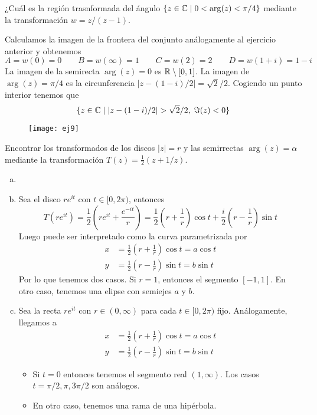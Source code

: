 \documentclass[twoside]{article}
\begin{document}
\begin{ejercicio}{9}
¿Cuál es la región trasnformada del ángulo $\{z\in \mathbb{C}\mid 0<\arg(z)<\pi/4\}$ mediante la transformación $w=z/(z-1)$.
\end{ejercicio}
\begin{solucion}
Calculamos la imagen de la frontera del conjunto análogamente al ejercicio anterior y obtenemos
$$
A = w(0)= 0 \qquad B=w(\infty)=1 \qquad C= w(2)=2 \qquad D =w(1+i) = 1-i 
$$
La imagen de la semirecta $\arg(z)=0$ es $\mathbb{R}\setminus[0,1]$. La imagen de $\arg(z)=\pi/4$ es la circunferencia $|z-(1-i)/2|=\sqrt{2}/2$. Cogiendo un punto interior tenemos que
$$
\{z\in \C \mid |z-(1-i)/2|>\sqrt{2}/2, \;\Im(z)<0\}
$$
\begin{figure}[h]
\texttt{[image: ej9]}
\centering
\end{figure}
\end{solucion}
\newpage

\begin{ejercicio}{10}
Encontrar los transformados de los discos $|z|=r$ y las semirrectas $\arg(z)=\alpha$ mediante la transformación $T(z)=\frac{1}{2}(z+1/z)$.
\end{ejercicio}
\begin{solucion}
\begin{enumerate}[(a)]
\item[]
\item Sea el disco $re^{it}$ con $t\in [0,2\pi)$, entonces
$$
T(re^{it}) =\frac{1}{2}\left(re^{it}+\frac{e^{-it}}{r}\right) = \frac{1}{2}\left(r+\frac{1}{r}\right)\cos t + \frac{i}{2}\left(r-\frac{1}{r}\right)\sin t
$$
Luego puede ser interpretado como la curva parametrizada por 
\begin{align*}
x &= \frac{1}{2}\left(r+\frac{1}{r}\right)\cos t = a\cos t\\
y &= \frac{1}{2}\left(r-\frac{1}{r}\right)\sin t = b\sin t
\end{align*}
Por lo que tenemos dos casos. Si $r=1$, entonces el segmento $[-1,1]$. En otro caso, tenemos una elipse con semiejes $a$ y $b$.
\item Sea la recta $re^{it}$ con $r\in(0,\infty)$ para cada $t \in [0,2\pi)$ fijo. Análogamente, llegamos a
\begin{align*}
x &= \frac{1}{2}\left(r+\frac{1}{r}\right)\cos t = a\cos t\\
y &= \frac{1}{2}\left(r-\frac{1}{r}\right)\sin t = b\sin t
\end{align*} 
\begin{itemize}
\item Si $t=0$ entonces tenemos el segmento real $(1,\infty)$. Los casos $t=\pi/2, \pi, 3\pi/2$ son análogos.
\item En otro caso, tenemos una rama de una hipérbola.
\end{itemize}
\end{enumerate}
\end{solucion}
\newpage
\end{document}
